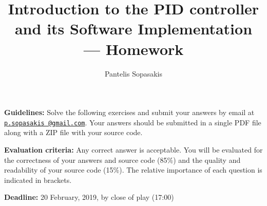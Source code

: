 \documentclass[a4paper,11pt,reqno]{amsart}
\title[PID Controller]{Introduction to the PID controller and its Software Implementation --- Homework}
\author[P. Sopasakis]{Pantelis Sopasakis}
\numberwithin{equation}{section}
\theoremstyle{plain}
\begin{document}
\maketitle
\noindent \textbf{Guidelines:} 
Solve the following exercises and submit your answers by email at 
\href{mailto:p.sopasakis@gmail.com}{\texttt{p.sopasakis
@gmail.com}}.
Your answers should be submitted in a single PDF file along with a ZIP file with your source 
code.

\vspace{1em}

\noindent \textbf{Evaluation criteria:} Any correct answer is acceptable. You will be evaluated 
for the correctness of your answers and source code (85\%) and the quality and readability of 
your source code (15\%). The relative importance of each question is indicated in brackets.

\vspace{1em}

\noindent  \textbf{Deadline:} 20 February, 2019, by close of play (17:00)
\end{document}
